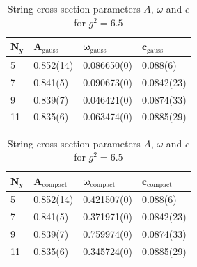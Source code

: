 \begin{table}[!hb]
\centering
\begin{tabular}{llll}
    $\mathbf{N_y}$ & $\mathbf{A_\mathrm{gauss}}$ & $\mathbf{\omega_\mathrm{gauss}}$ & $\mathbf{c_\mathrm{gauss}}$ \\ \hline
   5 & 0.852(14) & 0.086650(0) & 0.088(6) \\
   7 & 0.841(5) & 0.090673(0) & 0.0842(23) \\
   9 & 0.839(7) & 0.046421(0) & 0.0874(33) \\
   11 & 0.835(6) & 0.063474(0) & 0.0885(29) \\
\end{tabular}
\begin{tabular}{llll}
    $\mathbf{N_y}$ & $\mathbf{A_\mathrm{compact}}$ & $\mathbf{\omega_\mathrm{compact}}$ & $\mathbf{c_\mathrm{compact}}$ \\ \hline
   5 & 0.852(14) & 0.421507(0) & 0.088(6) \\
   7 & 0.841(5) & 0.371971(0) & 0.0842(23) \\
   9 & 0.839(7) & 0.759974(0) & 0.0874(33) \\
   11 & 0.835(6) & 0.345724(0) & 0.0885(29) \\
\end{tabular}
\caption{String cross section parameters $A$, $\omega$ and $c$ for $g^2=6.5$}
\end{table}
